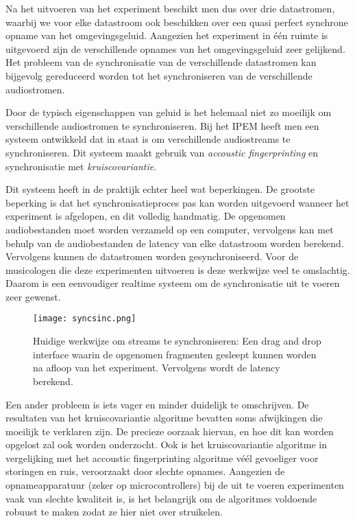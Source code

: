 Na het uitvoeren van het experiment beschikt men dus over drie datastromen, waarbij we voor elke datastroom ook beschikken over een quasi perfect synchrone opname van het omgevingsgeluid. Aangezien het experiment in één ruimte is uitgevoerd zijn de verschillende opnames van het omgevingsgeluid zeer gelijkend. Het probleem van de synchronisatie van de verschillende datastromen kan bijgevolg gereduceerd worden tot het synchroniseren van de verschillende audiostromen.

Door de typisch eigenschappen van geluid is het helemaal niet zo moeilijk om verschillende audiostromen te synchroniseren. Bij het IPEM heeft men een systeem ontwikkeld dat in staat is om verschillende audiostreams te synchroniseren. Dit systeem maakt gebruik van \textit{accoustic fingerprinting} en synchronisatie met \textit{kruiscovariantie}.

Dit systeem heeft in de praktijk echter heel wat beperkingen. De grootste beperking is dat het synchronisatieproces pas kan worden uitgevoerd wanneer het experiment is afgelopen, en dit volledig handmatig. De opgenomen audiobestanden moet worden verzameld op een computer, vervolgens kan met behulp van de audiobestanden de latency van elke datastroom worden berekend. Vervolgens kunnen de datastromen worden gesynchroniseerd. Voor de musicologen die deze experimenten uitvoeren is deze werkwijze veel te omslachtig. Daarom is een eenvoudiger realtime systeem om de synchronisatie uit te voeren zeer gewenst.

\begin{figure}[!h]
	\captionsetup{width=0.7\textwidth}
	\centering
	\texttt{[image: syncsinc.png]}
	\caption[Huidge werkwijze voor streamsynchronisatie]{Huidige werkwijze om streams te synchroniseren: Een drag and drop interface waarin de opgenomen fragmenten gesleept kunnen worden na afloop van het experiment. Vervolgens wordt de latency berekend.}
\end{figure}


Een ander probleem is iets vager en minder duidelijk te omschrijven. De resultaten van het kruiscovariantie algoritme bevatten soms afwijkingen die moeilijk te verklaren zijn. De precieze oorzaak hiervan, en hoe dit kan worden opgelost zal ook worden onderzocht. Ook is het kruiscovariantie algoritme in vergelijking met het accoustic fingerprinting algoritme véél gevoeliger voor storingen en ruis, veroorzaakt door slechte opnames. Aangezien de opnameapparatuur (zeker op microcontrollers) bij de uit te voeren experimenten vaak van slechte kwaliteit is, is het belangrijk om de algoritmes voldoende robuust te maken zodat ze hier niet over struikelen.\\

